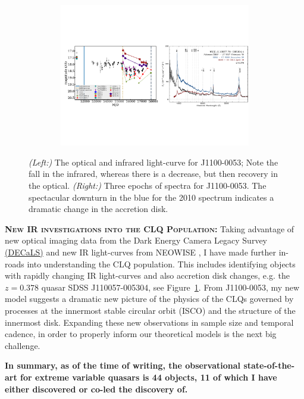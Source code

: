\begin{figure}[h]
  \begin{center}
    \hspace{-0.5cm}
    \includegraphics[height=6.25cm,width=17.2cm]
    {figures/J110057_LC_Spectra_20171024.pdf}
    \vspace{-10pt}
    \caption{\footnotesize 
      {\it (Left:)} The optical and infrared light-curve for
      J1100-0053; Note the fall in the infrared, whereas there is a
      decrease, but then recovery in the optical.  {\it (Right:)} Three
      epochs of spectra for J1100-0053.  The spectacular downturn in the
      blue for the 2010 spectrum indicates a dramatic change in the
      accretion disk.}
    \vspace{-16pt}
    \label{fig:J1100}
  \end{center}
\end{figure}

\smallskip
\smallskip
\noindent
\textbf{\textsc{New IR investigations into the CLQ Population:}}
Taking advantage of new optical imaging data from the Dark Energy
Camera Legacy Survey \href{http://legacysurvey.org/decamls/}{(DECaLS)}
and new IR light-curves from NEOWISE \citep{Meisner2017a,
Meisner2017b}, I have made further in-roads into understanding the CLQ
population. This includes identifying objects with rapidly changing IR
light-curves and also accretion disk changes, e.g. the $z=0.378$
quasar SDSS J110057-005304, see Figure~\ref{fig:J1100}. From
J1100-0053, my new model \citep{Ross2018} suggests a dramatic new
picture of the physics of the CLQs governed by processes at the
innermost stable circular orbit (ISCO) and the structure of the
innermost disk. Expanding these new observations in sample size and
temporal cadence, in order to properly inform our theoretical models
is the next big challenge.

\smallskip
\smallskip
\noindent
{\bf In summary, as of the time of writing, the observational
state-of-the-art for extreme variable quasars is 44 objects, 11 of
which I have either discovered or co-led the discovery of.}



